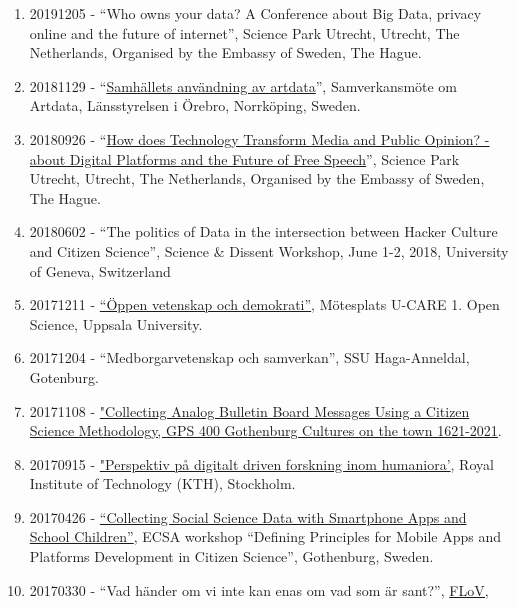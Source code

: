 \documentclass[
]{article}
\providecommand{\tightlist}{%
  \setlength{\itemsep}{0pt}\setlength{\parskip}{0pt}}
\begin{document}
\begin{enumerate}
\def\labelenumi{\arabic{enumi}.}
\tightlist
\item
  20191205 - ``Who owns your data? A Conference about Big Data, privacy
  online and the future of internet'', Science Park Utrecht, Utrecht,
  The Netherlands, Organised by the Embassy of Sweden, The Hague.
\item
  20181129 -
  ``\href{https://www.lansstyrelsen.se/orebro/kalenderhandelser---orebro/2018-10-16-samverkansmote-om-artdata.html}{Samhällets
  användning av artdata}'', Samverkansmöte om Artdata, Länsstyrelsen i
  Örebro, Norrköping, Sweden.
\item
  20180926 - ``\href{https://www.swedenabroad.se/free-speech}{How does
  Technology Transform Media and Public Opinion? - about Digital
  Platforms and the Future of Free Speech}'', Science Park Utrecht,
  Utrecht, The Netherlands, Organised by the Embassy of Sweden, The
  Hague.
\item
  20180602 - ``The politics of Data in the intersection between Hacker
  Culture and Citizen Science'', Science \& Dissent Workshop, June 1-2,
  2018, University of Geneva, Switzerland
\item
  20171211 -
  \href{http://www.u-care.uu.se/kalendarium/evenemang/?eventId=29958}{``Öppen
  vetenskap och demokrati''}, Mötesplats U-CARE 1. Open Science, Uppsala
  University.
\item
  20171204 - ``Medborgarvetenskap och samverkan'', SSU Haga-Anneldal,
  Gotenburg.
\item
  20171108 -
  \href{http://gps400.gu.se/digitalAssets/1662/1662945_gps400-conference_final-programme.pdf}{"Collecting
  Analog Bulletin Board Messages Using a Citizen Science Methodology,
  GPS 400 Gothenburg Cultures on the town 1621-2021}.
\item
  20170915 -
  \href{http://patriksv.net/2017/08/program-and-inbjudna-deltagare-15-september-pa-kth/}{"Perspektiv
  på digitalt driven forskning inom humaniora'}, Royal Institute of
  Technology (KTH), Stockholm.
\item
  20170426 -
  \href{https://ecsa.citizen-science.net/sites/default/files/draft_agenda_second_workshop_appsplatforms.pdf}{``Collecting
  Social Science Data with Smartphone Apps and School Children''}, ECSA
  workshop ``Defining Principles for Mobile Apps and Platforms
  Development in Citizen Science'', Gothenburg, Sweden.
\item
  20170330 - ``Vad händer om vi inte kan enas om vad som är sant?'',
  \href{http://flov.gu.se/aktuellt/Nyheter/fulltext//oppet-hus-pa-flov-med-panelsamtal-om-alternativa-fakta-och-informationsbubblor.cid1428426}{FLoV,
}
\end{enumerate}
\end{document}
